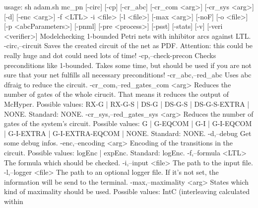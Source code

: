 usage: sh adam.sh mc_pn [-circ] [-cp] [-cr_abc] [-cr_com <arg>] [-cr_sys
       <arg>] [-d] [-enc <arg>] -f <LTL> -i <file> [-l <file>] [-max
       <arg>] [-noF] [-o <file>] [-p <abcParameters>] [-pnml] [-pre
       <process>] [-psst] [-stats] [-v] [-veri <verifier>]
Modelchecking 1-bounded Petri nets with inhibitor arcs against LTL.
 -circ,--circuit                      Saves the created circuit of the net
                                      as PDF. Attention: this could be
                                      really huge and dot could need lots
                                      of time!
 -cp,--check-precon                   Checks preconditions like 1-bounded.
                                      Takes some time, but should be used
                                      if you are not sure that your net
                                      fulfills  all necessary
                                      preconditions!
 -cr_abc,--red_abc                    Uses abc dfraig to reduce the
                                      circuit.
 -cr_com,--red_gates_com <arg>        Reduces the number of gates of the
                                      whole cirucit. That means it reduces
                                      the output of McHyper. Possible
                                      values: RX-G | RX-G-S | DS-G |
                                      DS-G-S | DS-G-S-EXTRA | NONE.
                                      Standard: NONE.
 -cr_sys,--red_gates_sys <arg>        Reduces the number of gates of the
                                      system's circuit. Possible values: G
                                      | G-EQCOM | G-I | G-I-EQCOM |
                                      G-I-EXTRA | G-I-EXTRA-EQCOM | NONE.
                                      Standard: NONE.
 -d,--debug                           Get some debug infos.
 -enc,--encoding <arg>                Encoding of the transitions in the
                                      circuit. Possible values: logEnc |
                                      expEnc. Standard: logEnc.
 -f,--formula <LTL>                   The formula which should be checked.
 -i,--input <file>                    The path to the input file.
 -l,--logger <file>                   The path to an optional logger file.
                                      If it's not set, the information
                                      will be send to the terminal.
 -max,--maximality <arg>              States which kind of maximality
                                      should be used. Possible values:
                                      IntC (interleaving calculated within
